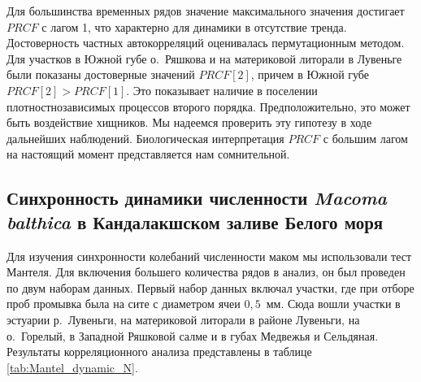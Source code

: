 Для большинства временных рядов значение максимального значения достигает $PRCF$ с лагом 1, что характерно для динамики в отсутствие тренда. 
Достоверность частных автокорреляций оценивалась пермутационным методом.
Для участков в Южной губе о.~Ряшкова и на материковой литорали в Лувеньге были показаны достоверные значений $PRCF[2]$, причем в Южной губе $PRCF[2] > PRCF[1]$. 
Это показывает наличие в поселении плотностнозависимых процессов второго порядка.
Предположительно, это может быть воздействие хищников.
Мы надеемся проверить эту гипотезу в ходе дальнейших наблюдений.
Биологическая интерпретация $PRCF$ с большим лагом на настоящий момент представляется нам сомнительной.

		\subsection{Синхронность динамики численности {\it Macoma balthica} в Кандалакшском заливе Белого моря}
Для изучения синхронности колебаний численности маком мы использовали тест Мантеля.
Для включения большего количества рядов в анализ, он был проведен по двум наборам данных.
Первый набор данных включал участки, где при отборе проб промывка была на сите с диаметром ячеи $0,5$~мм. 
Сюда вошли участки в эстуарии р.~Лувеньги, на материковой литорали в районе Лувеньги, на о.~Горелый, в Западной Ряшковой салме и в губах Медвежья и Сельдяная.
Результаты корреляционного анализа представлены в таблице \ref{tab:Mantel_dynamic_N}.
